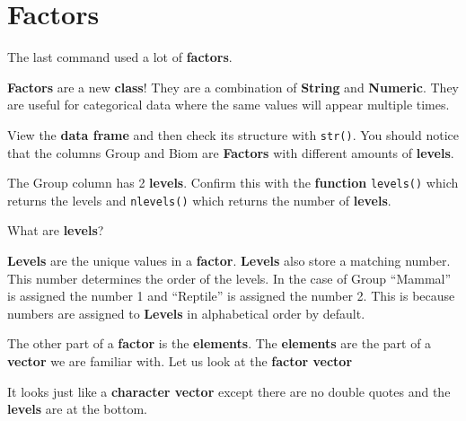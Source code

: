\documentclass[]{book}
\newenvironment{Shaded}{\begin{snugshade}}{\end{snugshade}}
\newcommand{\KeywordTok}[1]{\textcolor[rgb]{0.13,0.29,0.53}{\textbf{#1}}}
\newcommand{\OperatorTok}[1]{\textcolor[rgb]{0.81,0.36,0.00}{\textbf{#1}}}
\newcommand{\NormalTok}[1]{#1}
\begin{document}
\section{Factors}\label{factors}

The last command used a lot of \textbf{factors}.

\textbf{Factors} are a new \textbf{class}! They are a combination of
\textbf{String} and \textbf{Numeric}. They are useful for categorical
data where the same values will appear multiple times.

View the \textbf{data frame} and then check its structure with
\texttt{str()}. You should notice that the columns Group and Biom are
\textbf{Factors} with different amounts of \textbf{levels}.

The Group column has 2 \textbf{levels}. Confirm this with the
\textbf{function} \texttt{levels()} which returns the levels and
\texttt{nlevels()} which returns the number of \textbf{levels}.

\begin{Shaded}
\end{Shaded}

What are \textbf{levels}?

\textbf{Levels} are the unique values in a \textbf{factor}.
\textbf{Levels} also store a matching number. This number determines the
order of the levels. In the case of Group ``Mammal'' is assigned the
number 1 and ``Reptile'' is assigned the number 2. This is because
numbers are assigned to \textbf{Levels} in alphabetical order by
default.

The other part of a \textbf{factor} is the \textbf{elements}. The
\textbf{elements} are the part of a \textbf{vector} we are familiar
with. Let us look at the \textbf{factor vector}

\begin{Shaded}
\end{Shaded}

It looks just like a \textbf{character vector} except there are no
double quotes and the \textbf{levels} are at the bottom.
\end{document}
